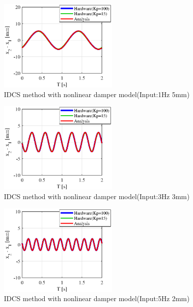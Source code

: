 \documentclass[a4paper,12pt]{article_vdlab_sotsuron}
\begin{document}
\vspace{5mm}
\begin{figure}[htp]
  \begin{center}
    \includegraphics[height=45mm]{figure/sim_idcs_5_1_nonlinear.eps}
    \caption{IDCS method with nonlinear damper model(Input:1Hz 5mm)}
    \label{fig:sim_nonlinear_3_1}
  \end{center}
\end{figure}

\vspace{2mm}
\begin{figure}[htp]
  \begin{center}
    \includegraphics[height=45mm]{figure/sim_idcs_3_3_nonlinear.eps}
    \caption{IDCS method with nonlinear damper model(Input:3Hz 3mm)}
    \label{fig:sim_nonlinear_5_3}
  \end{center}
\end{figure}

\vspace{2mm}
\begin{figure}[htp]
  \begin{center}
    \includegraphics[height=45mm]{figure/sim_idcs_2_5_nonlinear.eps}
    \caption{IDCS method with nonlinear damper model(Input:5Hz 2mm)}
    \label{fig:sim_nonlinear_2_5}
  \end{center}
\end{figure}
\end{document}
